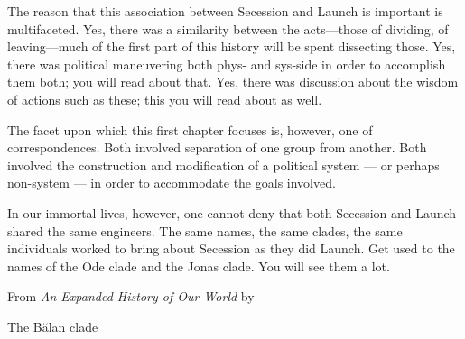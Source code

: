   The reason that this association between Secession and Launch is important is multifaceted. Yes, there was a similarity between the acts---those of dividing, of leaving---much of the first part of this history will be spent dissecting those. Yes, there was political maneuvering both phys- and sys-side in order to accomplish them both; you will read about that. Yes, there was discussion about the wisdom of actions such as these; this you will read about as well.

  The facet upon which this first chapter focuses is, however, one of correspondences. Both involved separation of one group from another. Both involved the construction and modification of a political system — or perhaps non-system — in order to accommodate the goals involved.

  In our immortal lives, however, one cannot deny that both Secession and Launch shared the same engineers. The same names, the same clades, the same individuals worked to bring about Secession as they did Launch. Get used to the names of the Ode clade and the Jonas clade. You will see them a lot.

  \vspace{1em}

  From \emph{An Expanded History of Our World} by

  The Bălan clade
  
  \vfill












%


%





